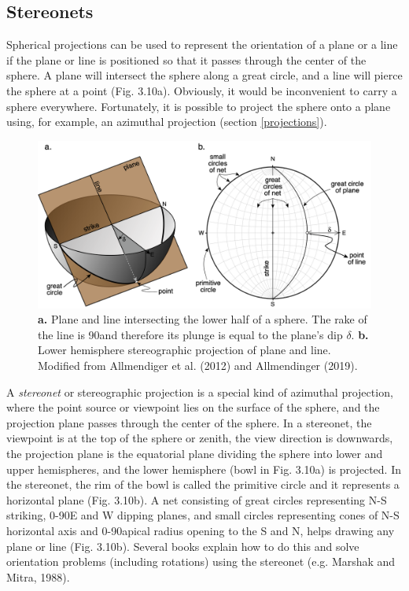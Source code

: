 \documentclass[a4paper , 12pt]{book}
\begin{document}
\subsection{Stereonets}

Spherical projections can be used to represent the orientation of a plane or a line if the plane or line is positioned so that it passes through the center of the sphere. A plane will intersect the sphere along a great circle, and a line will pierce the sphere at a point (Fig. 3.10a). Obviously, it would be inconvenient to carry a sphere everywhere. Fortunately, it is possible to project the sphere onto a plane using, for example, an azimuthal projection (section \ref{projections}).

\begin{figure}[ht]
    \centering
    \includegraphics[width=13cm]{Figures/ch3f10.png}
    \caption{\textbf{a.} Plane and line intersecting the lower half of a sphere. The rake of the line is 90\degree and therefore its plunge is equal to the plane’s dip $\delta$. \textbf{b.} Lower hemisphere stereographic projection of plane and line. Modified from Allmendiger et al. (2012) and Allmendinger (2019).}
\end{figure}

A \textit{stereonet} or stereographic projection is a special kind of azimuthal projection, where the point source or viewpoint lies on the surface of the sphere, and the projection plane passes through the center of the sphere. In a stereonet, the viewpoint is at the top of the sphere or zenith, the view direction is downwards, the projection plane is the equatorial plane dividing the sphere into lower and upper hemispheres, and the lower hemisphere (bowl in Fig. 3.10a) is projected. In the stereonet, the rim of the bowl is called the primitive circle and it represents a horizontal plane (Fig. 3.10b). A net consisting of great circles representing N-S striking, 0-90\degree E and W dipping planes, and small circles representing cones of N-S horizontal axis and 0-90\degree apical radius opening to the S and N, helps drawing any plane or line (Fig. 3.10b). Several books explain how to do this and solve orientation problems (including rotations) using the stereonet (e.g. Marshak and Mitra, 1988).
\end{document}
